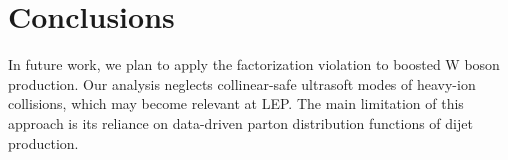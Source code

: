 \section{Conclusions}\label{sec:conclusions}

In future work, we plan to apply the factorization violation to boosted
W boson production. Our analysis neglects collinear-safe ultrasoft modes
of heavy-ion collisions, which may become relevant at LEP. The main
limitation of this approach is its reliance on data-driven parton
distribution functions of dijet production.

